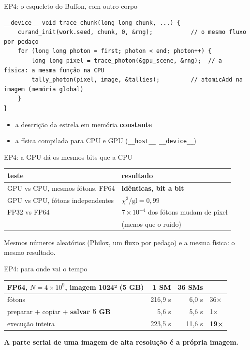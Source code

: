 \documentclass[aspectratio=169,11pt]{beamer}
\begin{document}
\begin{frame}[fragile]{EP4: o esqueleto do Buffon, com outro corpo}
  \begin{lstlisting}
__device__ void trace_chunk(long long chunk, ...) {
    curand_init(work.seed, chunk, 0, &rng);           // o mesmo fluxo por pedaço
    for (long long photon = first; photon < end; photon++) {
        long long pixel = trace_photon(&gpu_scene, &rng);  // a física: a mesma função na CPU
        tally_photon(pixel, image, &tallies);         // atomicAdd na imagem (memória global)
    }
}
  \end{lstlisting}
  \vfill
  \begin{itemize}
    \item a descrição da estrela em memória \textbf{constante}
    \item a física compilada para CPU e GPU (\texttt{\_\_host\_\_ \_\_device\_\_})
  \end{itemize}
\end{frame}

\begin{frame}{EP4: a GPU dá os mesmos bits que a CPU}
  \centering
  \begin{tabular}{ll}
    \toprule
    teste & resultado \\
    \midrule
    GPU vs CPU, mesmos fótons, FP64 & \textbf{idênticas, bit a bit} \\
    GPU vs CPU, fótons independentes & $\chi^2/\text{gl} = 0{,}99$ \\
    FP32 vs FP64 & $7\times10^{-4}$ dos fótons mudam de pixel \\
    & (menos que o ruído) \\
    \bottomrule
  \end{tabular}
  \vfill
  Mesmos números aleatórios (Philox, um fluxo por pedaço) e a mesma física: o mesmo resultado.
\end{frame}


\begin{frame}{EP4: para onde vai o tempo}
  \centering
  \begin{tabular}{lrrl}
    \toprule
    FP64, $N = 4\times10^{9}$, imagem 1024² (5 GB) & 1 SM & 36 SMs & \\
    \midrule
    fótons & 216,9 s & 6,0 s & 36× \\
    preparar + copiar + \textbf{salvar 5 GB} & 5,6 s & 5,6 s & 1× \\
    \midrule
    execução inteira & 223,5 s & 11,6 s & \textbf{19×} \\
    \bottomrule
  \end{tabular}
  \vfill
  \textbf{A parte serial de uma imagem de alta resolução é a própria imagem.}
\end{frame}
\end{document}
